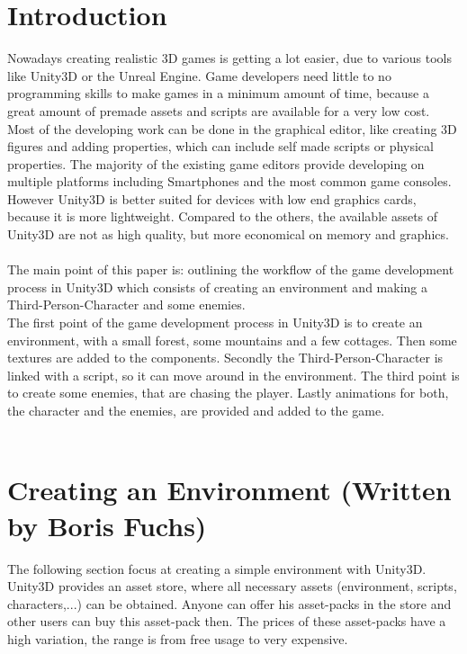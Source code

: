 \documentclass[conference]{IEEEtran}
\begin{document}
\section{Introduction}
Nowadays creating realistic 3D games is getting a lot easier, due to various tools like Unity3D or the Unreal Engine. Game developers need little to no programming skills to make games in a minimum amount of time, because a great amount of premade assets and scripts are available for a very low cost. Most of the developing work can be done in the graphical editor, like creating 3D figures and adding properties, which can include self made scripts or physical properties. The majority of the existing game editors provide developing on multiple platforms including Smartphones and the most common game consoles. However Unity3D is better suited for devices with low end graphics cards, because it is more lightweight. Compared to the others, the available assets of Unity3D are not as high quality, but more economical on memory and graphics. \\ \\
The main point of this paper is: outlining the workflow of the game development process in Unity3D which consists of creating an environment and making a Third-Person-Character and some enemies.  \\
The first point of the game development process in Unity3D is to create an environment, with a small forest, some mountains and a few cottages. Then some textures are added to the components.
Secondly the Third-Person-Character is linked with a  script, so it can move around in the environment.
The third point is to create some enemies, that are chasing the player. 
Lastly animations for both, the character and the enemies, are provided and added to the game. \\ \\

\section{Creating an Environment (Written by Boris Fuchs)}

The following section focus at creating a simple environment with Unity3D. 
Unity3D provides an asset store, where all necessary assets (environment, scripts, characters,...) can be obtained. Anyone can offer his asset-packs in the store and other users can buy this asset-pack then. The prices of these asset-packs have a high variation, the range is from free usage to very expensive. 
\end{document}
